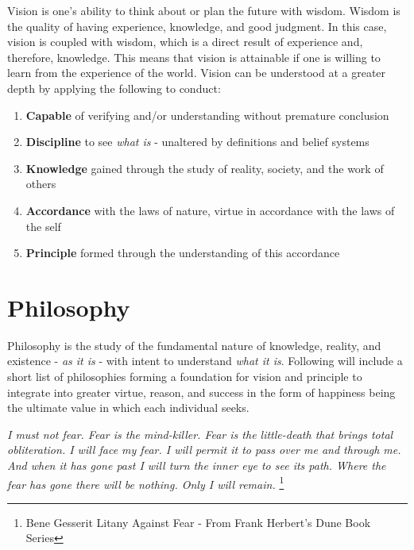 \documentclass[11pt]{article}
\begin{document}
Vision is one's ability to think about or plan the future with wisdom.
Wisdom is the quality of having experience, knowledge, and good judgment. 
In this case, vision is coupled with wisdom, which is a direct result of experience and, therefore, knowledge. 
This means that vision is attainable if one is willing to learn from the experience of the world.
Vision can be understood at a greater depth by applying the following to conduct:
\begin{enumerate}
\item \textbf{Capable} of verifying and/or understanding without premature conclusion
\item \textbf{Discipline} to see \textit{what is} - unaltered by definitions and belief systems
\item \textbf{Knowledge} gained through the study of reality, society, and the work of others
\item \textbf{Accordance} with the laws of nature, virtue in accordance with the laws of the self
\item \textbf{Principle} formed through the understanding of this accordance
\end{enumerate}

\section{Philosophy}

Philosophy is the study of the fundamental nature of knowledge, reality, and existence - \textit{as it is} - with intent to understand \textit{what it is}. 
Following will include a short list of philosophies forming a foundation for vision and principle to integrate into greater virtue, reason, and success in the form of happiness being the ultimate value in which each individual seeks.

\begin{center}
\textit{
I must not fear.\linebreak
Fear is the mind-killer.\linebreak
Fear is the little-death that brings total obliteration.\linebreak
I will face my fear.\linebreak
I will permit it to pass over me and through me.\linebreak
And when it has gone past I will turn the inner eye to see its path.\linebreak
Where the fear has gone there will be nothing. \linebreak
Only I will remain.\linebreak
}
\footnote{Bene Gesserit Litany Against Fear - From Frank Herbert's Dune Book Series}
\end{center}
\end{document}
